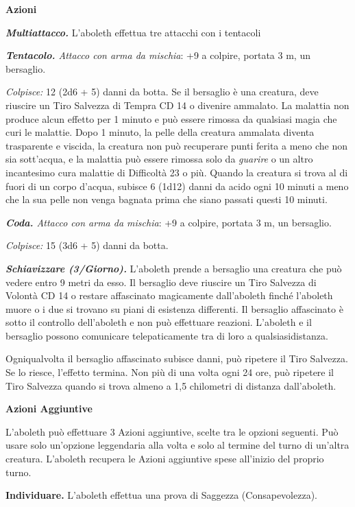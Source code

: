 \begin{multicols}{2}
\textbf{Azioni}

\emph{\textbf{Multiattacco.}} L'aboleth effettua tre attacchi con i tentacoli

\emph{\textbf{Tentacolo.} Attacco con arma da mischia}: +9 a colpire, portata 3 m, un bersaglio.

\emph{Colpisce:} 12 (2d6 + 5) danni da botta. Se il bersaglio è una creatura, deve riuscire un Tiro Salvezza di Tempra CD 14 o divenire ammalato. La malattia non produce alcun effetto per 1 minuto e può essere rimossa da qualsiasi magia che curi le malattie. Dopo 1 minuto, la pelle della creatura ammalata diventa trasparente e viscida, la creatura non può recuperare punti ferita a meno che non sia sott'acqua, e la malattia può essere rimossa solo da \emph{guarire} o un altro incantesimo cura malattie di Difficoltà 23 o più. Quando la creatura si trova al di fuori di un corpo d'acqua, subisce 6 (1d12) danni da acido ogni 10 minuti a meno che la sua pelle non venga bagnata prima che siano passati questi 10 minuti.

\emph{\textbf{Coda.} Attacco con arma da mischia}: +9 a colpire, portata 3 m, un bersaglio.

\emph{Colpisce:} 15 (3d6 + 5) danni da botta.

\emph{\textbf{Schiavizzare (3/Giorno).}} L'aboleth prende a bersaglio una creatura che può vedere entro 9 metri da esso. Il bersaglio deve riuscire un Tiro Salvezza di Volontà CD 14 o restare affascinato magicamente dall'aboleth finché l'aboleth muore o i due si trovano su piani di esistenza differenti. Il bersaglio affascinato è sotto il controllo dell'aboleth e non può effettuare reazioni. L'aboleth e il bersaglio possono comunicare telepaticamente tra di loro a qualsiasidistanza. 

Ogniqualvolta il bersaglio affascinato subisce danni, può ripetere il Tiro Salvezza. Se lo riesce, l'effetto termina. Non più di una volta ogni 24 ore, può ripetere il Tiro Salvezza quando si trova almeno a 1,5 chilometri di distanza dall'aboleth.

\textbf{Azioni Aggiuntive}

L'aboleth può effettuare 3 Azioni aggiuntive, scelte tra le opzioni seguenti. Può usare solo un'opzione leggendaria alla volta e solo al termine del turno di un'altra creatura. L'aboleth recupera le Azioni aggiuntive spese all'inizio del proprio turno.

\textbf{Individuare.} L'aboleth effettua una prova di Saggezza (Consapevolezza).


\end{multicols}
